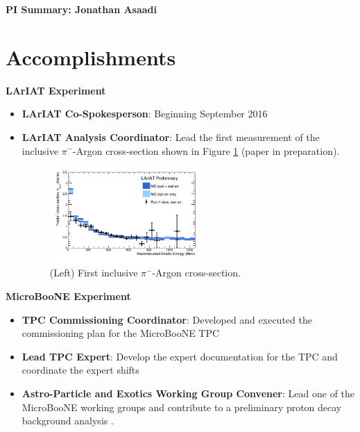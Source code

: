 
\begin{center}
\LARGE\textbf{PI Summary: Jonathan Asaadi}
\end{center}

\section*{\textbf{Accomplishments}}

\noindent\textbf{LArIAT Experiment}

\begin{itemize}[noitemsep,nolistsep]
\item{\textbf{LArIAT Co-Spokesperson}}: Beginning September 2016

\item{\textbf{LArIAT Analysis Coordinator}}: Lead the first measurement of the inclusive $\pi^{-}$-Argon cross-section shown in Figure \ref{fig:LArIATCrossSection} (paper in preparation).

\begin{figure}[htb]
\centering
\includegraphics[width=0.55\textwidth]{images/LArIATCrossSection.png}
\caption[]{(Left) First inclusive $\pi^{-}$-Argon cross-section.}
\label{fig:LArIATCrossSection}
\end{figure}


\end{itemize}

\noindent\textbf{MicroBooNE Experiment}
\begin{itemize}[noitemsep,nolistsep]
\item{\textbf{TPC Commissioning Coordinator}}: Developed and executed the commissioning plan for the MicroBooNE TPC

\item{\textbf{Lead TPC Expert}}: Develop the expert documentation for the TPC and coordinate the expert shifts

\item{\textbf{Astro-Particle and Exotics Working Group Convener}}: Lead one of the MicroBooNE working groups and contribute to a preliminary proton decay background analysis \cite{}.

\end{itemize}

